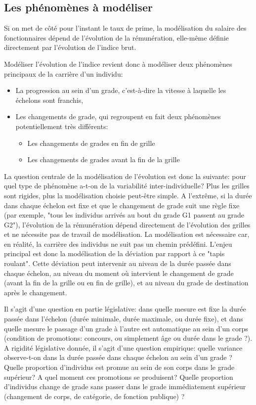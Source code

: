 \documentclass[11pt,a4paper]{article}
\begin{document}
\subsection*{Les phénomènes à modéliser}

Si on met de côté pour l'instant le taux de prime, la modélisation du salaire des fonctionnaires dépend de l'évolution de la rémunération, elle-même définie directement par l'évolution de l'indice brut. 

Modéliser l'évolution de l'indice revient donc à modéliser deux phénomènes principaux de la carrière d'un individu: 
\begin{itemize}[leftmargin=1cm ,parsep=0cm,itemsep=0cm,topsep=0cm] 
\item La progression au sein d'un grade, c'est-à-dire la vitesse à laquelle les échelons sont franchis,
\item Les changements de grade, qui regroupent en fait deux phénomènes potentiellement très différents: 
	\begin{itemize}[leftmargin=1cm ,parsep=0cm,itemsep=0cm,topsep=0cm] 
	\item Les changements de grades en fin de grille
	\item Les changements de grades avant la fin de la grille
	\end{itemize}
\end{itemize} 

\vspace{0.2cm}


La question centrale de la modélisation de l'évolution est donc la suivante: pour quel type de phénomène a-t-on de la variabilité inter-individuelle? Plus les grilles sont rigides, plus la modélisation choisie peut-être simple. A l'extrême, si la durée dans chaque échelon est fixe et que le changement de grade suit une règle fixe (par exemple, "tous les individus arrivés au bout du grade G1 passent au grade G2"), l'évolution de la rémunération dépend directement de l'évolution des grilles et ne nécessite pas de travail de modélisation. La modélisation est nécessaire car, en réalité, la carrière des individus ne suit pas un chemin prédéfini. L'enjeu principal est donc la modélisation de la déviation par rapport à ce "tapis roulant". Cette déviation peut intervenir au niveau de la durée passée dans chaque échelon, au niveau du moment où intervient le changement de grade (avant la fin de la grille ou en fin de grille), et au niveau du grade de destination après le changement. 

Il s'agit d'une question en partie législative: dans quelle mesure est fixe la durée passée dans l'échelon (durée minimale, durée maximale, ou durée fixe), et dans quelle mesure le passage d'un grade à l'autre est automatique au sein d'un corps (condition de promotions: concours, ou simplement âge ou durée dans le grade ?). A rigidité législative donnée, il s'agit d'une question empirique: quelle variance observe-t-on dans la durée passée dans chaque échelon au sein d'un grade ? Quelle proportion d'individus est promue au sein de son corps dans le grade supérieur? A quel moment ces promotions se produisent? Quelle proportion d'individus change de grade sans passer dans le grade immédiatement supérieur (changement de corps, de catégorie, de fonction publique) ?
\end{document}
